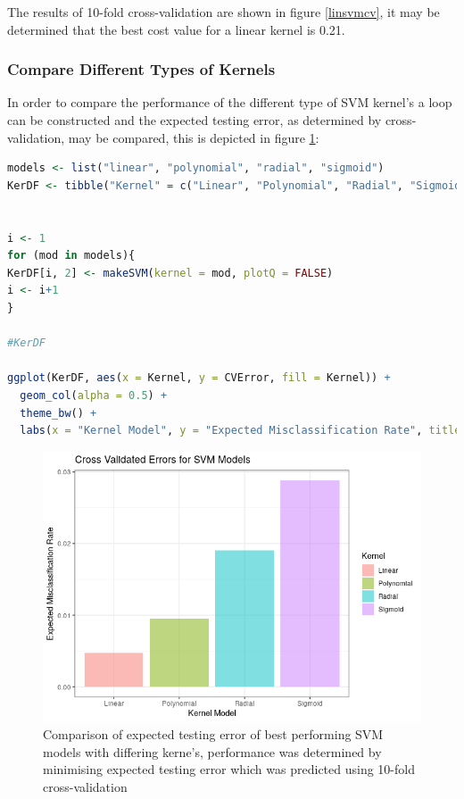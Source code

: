 \documentclass[
]{article}
\begin{document}
The results of 10-fold cross-validation are shown in figure \ref{linsvmcv}, it may be determined that the best cost value for
a linear kernel is 0.21.

\newpage

\hypertarget{compare-different-types-of-kernels}{%
\subsubsection{Compare Different Types of
Kernels}\label{compare-different-types-of-kernels}}

In order to compare the performance of the different type of SVM
kernel's a loop can be constructed and the expected testing error, as
determined by cross-validation, may be compared, this is depicted in figure \ref{svmcomp}:

\begin{lstlisting}[language=R]
models <- list("linear", "polynomial", "radial", "sigmoid")
KerDF <- tibble("Kernel" = c("Linear", "Polynomial", "Radial", "Sigmoid"), "CVError" = rep(NA, 4))


i <- 1
for (mod in models){
KerDF[i, 2] <- makeSVM(kernel = mod, plotQ = FALSE)
i <- i+1 
}

#KerDF

ggplot(KerDF, aes(x = Kernel, y = CVError, fill = Kernel)) +
  geom_col(alpha = 0.5) + 
  theme_bw() +
  labs(x = "Kernel Model", y = "Expected Misclassification Rate", title = "Cross Validated Errors for SVM Models")
\end{lstlisting}

\begin{figure}
	\centering
	\includegraphics[width=0.7\linewidth]{SecAssignment_files/figure-html/unnamed-chunk-46-1.png}
	\caption{Comparison of expected testing error of best performing SVM models with differing kerne's, performance was determined by minimising expected testing error which was predicted using 10-fold cross-validation}
	\label{svmcomp}
\end{figure}
\end{document}

